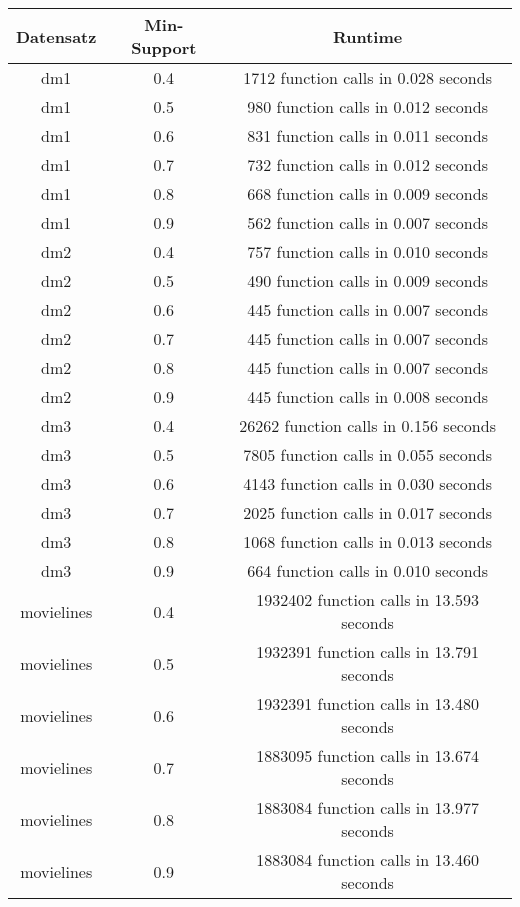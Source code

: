 \documentclass{article}
\begin{document}
\begin{tabular}{c|c|c}
  Datensatz & Min-Support & Runtime \\
  \hline
  dm1 & 0.4 &  1712 function calls in 0.028 seconds \\
  dm1 & 0.5 &  980 function calls in 0.012 seconds \\
  dm1 & 0.6 &  831 function calls in 0.011 seconds \\
  dm1 & 0.7 &  732 function calls in 0.012 seconds \\
  dm1 & 0.8 &  668 function calls in 0.009 seconds \\
  dm1 & 0.9 &  562 function calls in 0.007 seconds \\
  
  dm2 & 0.4 &  757 function calls in 0.010 seconds \\
  dm2 & 0.5 &  490 function calls in 0.009 seconds \\
  dm2 & 0.6 &  445 function calls in 0.007 seconds \\
  dm2 & 0.7 &  445 function calls in 0.007 seconds \\
  dm2 & 0.8 &  445 function calls in 0.007 seconds \\
  dm2 & 0.9 &  445 function calls in 0.008 seconds \\
  
  dm3 & 0.4 &  26262 function calls in 0.156 seconds \\
  dm3 & 0.5 &  7805 function calls in 0.055 seconds \\
  dm3 & 0.6 &  4143 function calls in 0.030 seconds \\
  dm3 & 0.7 &  2025 function calls in 0.017 seconds \\
  dm3 & 0.8 &  1068 function calls in 0.013 seconds \\
  dm3 & 0.9 &  664 function calls in 0.010 seconds \\
  
  movielines & 0.4 &  1932402 function calls in 13.593 seconds \\
  movielines & 0.5 &  1932391 function calls in 13.791 seconds \\
  movielines & 0.6 &  1932391 function calls in 13.480 seconds \\
  movielines & 0.7 &  1883095 function calls in 13.674 seconds \\
  movielines & 0.8 &  1883084 function calls in 13.977 seconds \\
  movielines & 0.9 &  1883084 function calls in 13.460 seconds \\
\end{tabular}
\end{document}
